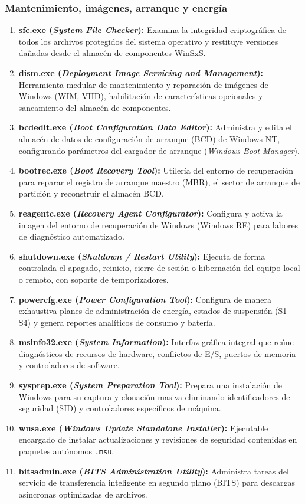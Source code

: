 \documentclass[12pt]{article}
\begin{document}
\subsubsection{Mantenimiento, imágenes, arranque y energía}
\begin{enumerate}[leftmargin=*, noitemsep, topsep=1pt]
    \item \textbf{sfc.exe (\textit{System File Checker}):} Examina la integridad criptográfica de todos los archivos protegidos del sistema operativo y restituye versiones dañadas desde el almacén de componentes WinSxS.
    \item \textbf{dism.exe (\textit{Deployment Image Servicing and Management}):} Herramienta medular de mantenimiento y reparación de imágenes de Windows (WIM, VHD), habilitación de características opcionales y saneamiento del almacén de componentes.
    \item \textbf{bcdedit.exe (\textit{Boot Configuration Data Editor}):} Administra y edita el almacén de datos de configuración de arranque (BCD) de Windows NT, configurando parámetros del cargador de arranque (\textit{Windows Boot Manager}).
    \item \textbf{bootrec.exe (\textit{Boot Recovery Tool}):} Utilería del entorno de recuperación para reparar el registro de arranque maestro (MBR), el sector de arranque de partición y reconstruir el almacén BCD.
    \item \textbf{reagentc.exe (\textit{Recovery Agent Configurator}):} Configura y activa la imagen del entorno de recuperación de Windows (Windows RE) para labores de diagnóstico automatizado.
    \item \textbf{shutdown.exe (\textit{Shutdown / Restart Utility}):} Ejecuta de forma controlada el apagado, reinicio, cierre de sesión o hibernación del equipo local o remoto, con soporte de temporizadores.
    \item \textbf{powercfg.exe (\textit{Power Configuration Tool}):} Configura de manera exhaustiva planes de administración de energía, estados de suspensión (S1--S4) y genera reportes analíticos de consumo y batería.
    \item \textbf{msinfo32.exe (\textit{System Information}):} Interfaz gráfica integral que reúne diagnósticos de recursos de hardware, conflictos de E/S, puertos de memoria y controladores de software.
    \item \textbf{sysprep.exe (\textit{System Preparation Tool}):} Prepara una instalación de Windows para su captura y clonación masiva eliminando identificadores de seguridad (SID) y controladores específicos de máquina.
    \item \textbf{wusa.exe (\textit{Windows Update Standalone Installer}):} Ejecutable encargado de instalar actualizaciones y revisiones de seguridad contenidas en paquetes autónomos \texttt{.msu}.
    \item \textbf{bitsadmin.exe (\textit{BITS Administration Utility}):} Administra tareas del servicio de transferencia inteligente en segundo plano (BITS) para descargas asíncronas optimizadas de archivos.
\end{enumerate}
\end{document}
